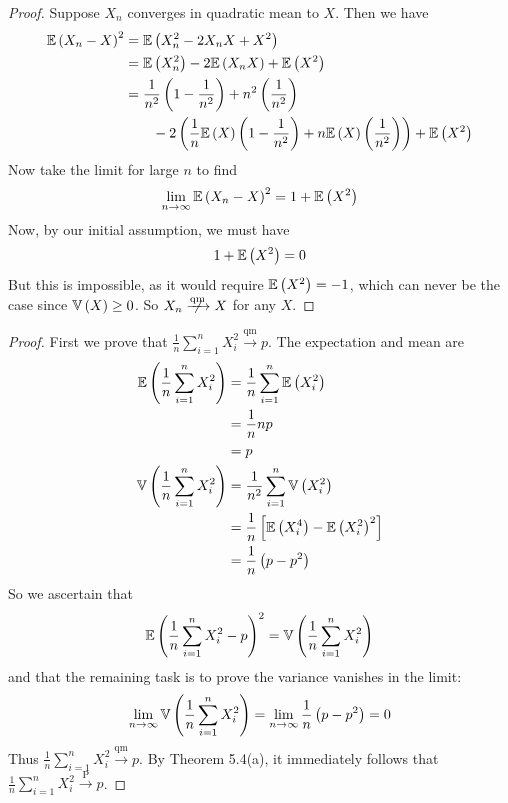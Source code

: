 \documentclass[a4paper]{article}
\begin{document}
\begin{proof}[Proof] 
Suppose \(X_{n}\) converges in quadratic mean to \(X\). Then we have
\begin{align*}
	\mathbb{E}\left( X_{n} - X \right)^{2} & = \mathbb{E}\left( X^{2}_{n} - 2X_{n}X + X^{2} \right) \\
	 & = \mathbb{E}\left( X^{2}_{n} \right) - 2 \mathbb{E}\left( X_{n}X \right) + \mathbb{E}\left( X^{2} \right) \\
	 & = \frac{1}{n^{2}} \left( 1 - \frac{1}{n^{2}} \right) + n^{2} \left( \frac{1}{n^{2}} \right) \\
	 & \qquad - 2 \left( \frac{1}{n} \mathbb{E}\left( X \right) \left( 1 - \frac{1}{n^{2}} \right) + n \mathbb{E}\left( X \right) \left( \frac{1}{n^{2}} \right)  \right) + \mathbb{E}\left( X^{2} \right) \\
\end{align*}
Now take the limit for large \(n\) to find
\[
	\lim_{n \to \infty} \mathbb{E}\left( X_{n} - X \right)^{2} = 1 + \mathbb{E}\left( X^{2} \right)
\]
Now, by our initial assumption, we must have
\[
	1 + \mathbb{E}\left( X^{2} \right) = 0
\]
But this is impossible, as it would require \(\mathbb{E}\left( X^{2} \right) = -1\), which can never be the case since \(\mathbb{V}\left( X \right) \ge 0\). So \(X_{n} \centernot{\xrightarrow{\text{qm}}} X\) for any \(X\).
\end{proof}

\begin{proof}[Proof] 
First we prove that \(\frac{1}{n} \sum_{i=1}^{n} X^{2}_{i} \xrightarrow{\text{qm}} p\). The expectation and mean are
\begin{align*}
	\mathbb{E}\left( \frac{1}{n} \sum_{i=1}^{n} X^{2}_{i} \right) & = \frac{1}{n} \sum_{i=1}^{n} \mathbb{E}\left( X^{2}_{i} \right) \\
	 & = \frac{1}{n} np \\ 
	 & = p \\
	\mathbb{V}\left( \frac{1}{n} \sum_{i=1}^{n} X^{2}_{i} \right) & = \frac{1}{n^{2}} \sum_{i=1}^{n} \mathbb{V}\left( X^{2}_{i} \right) \\
	 & = \frac{1}{n} \left[ \mathbb{E}\left( X^{4}_{i} \right) - \mathbb{E}\left( X^{2}_{i} \right)^{2} \right] \\
	 & = \frac{1}{n} \left( p - p^{2} \right) 
\end{align*}
So we ascertain that 
\[
	\mathbb{E}\left( \frac{1}{n} \sum_{i=1}^{n} X^{2}_{i} - p \right)^{2} = \mathbb{V}\left( \frac{1}{n} \sum_{i=1}^{n} X^{2}_{i} \right)
\]
and that the remaining task is to prove the variance vanishes in the limit:
\[
	\lim_{n \to \infty} \mathbb{V}\left( \frac{1}{n} \sum_{i=1}^{n} X^{2}_{i} \right) = \lim_{n \to \infty} \frac{1}{n} \left( p - p^{2} \right) = 0
\]
Thus \(\frac{1}{n} \sum_{i=1}^{n} X^{2}_{i} \xrightarrow{\text{qm}} p \). By Theorem 5.4(a), it immediately follows that \(\frac{1}{n} \sum_{i=1}^{n} X^{2}_{i} \xrightarrow{\text{ P }} p\).
\end{proof}
\end{document}
